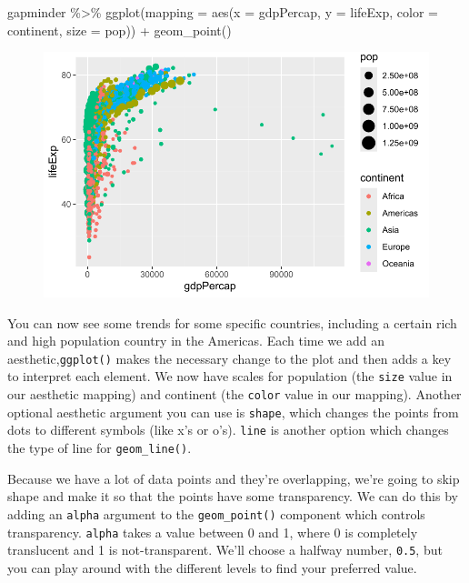 \documentclass[
  letterpaper,
]{book}
\newenvironment{Shaded}{\begin{snugshade}}{\end{snugshade}}
\newcommand{\AttributeTok}[1]{\textcolor[rgb]{0.40,0.45,0.13}{#1}}
\newcommand{\FunctionTok}[1]{\textcolor[rgb]{0.28,0.35,0.67}{#1}}
\newcommand{\NormalTok}[1]{\textcolor[rgb]{0.00,0.23,0.31}{#1}}
\newcommand{\SpecialCharTok}[1]{\textcolor[rgb]{0.37,0.37,0.37}{#1}}
\begin{document}
\begin{Shaded}
\begin{Highlighting}[]
\NormalTok{gapminder }\SpecialCharTok{\%\textgreater{}\%}
  \FunctionTok{ggplot}\NormalTok{(}\AttributeTok{mapping =} \FunctionTok{aes}\NormalTok{(}\AttributeTok{x =}\NormalTok{ gdpPercap, }
                       \AttributeTok{y =}\NormalTok{ lifeExp,}
                       \AttributeTok{color =}\NormalTok{ continent,}
                       \AttributeTok{size =}\NormalTok{ pop)) }\SpecialCharTok{+}
  \FunctionTok{geom\_point}\NormalTok{()}
\end{Highlighting}
\end{Shaded}

\begin{figure}[H]

{\centering \includegraphics{visualizing-with-ggplot_files/figure-pdf/unnamed-chunk-19-1.pdf}

}

\end{figure}

You can now see some trends for some specific countries, including a
certain rich and high population country in the Americas. Each time we
add an aesthetic,\texttt{ggplot()} makes the necessary change to the
plot and then adds a key to interpret each element. We now have scales
for population (the \texttt{size} value in our aesthetic mapping) and
continent (the \texttt{color} value in our mapping). Another optional
aesthetic argument you can use is \texttt{shape}, which changes the
points from dots to different symbols (like x's or o's). \texttt{line}
is another option which changes the type of line for
\texttt{geom\_line()}.

Because we have a lot of data points and they're overlapping, we're
going to skip shape and make it so that the points have some
transparency. We can do this by adding an \texttt{alpha} argument to the
\texttt{geom\_point()} component which controls transparency.
\texttt{alpha} takes a value between 0 and 1, where 0 is completely
translucent and 1 is not-transparent. We'll choose a halfway number,
\texttt{0.5}, but you can play around with the different levels to find
your preferred value.
\end{document}
